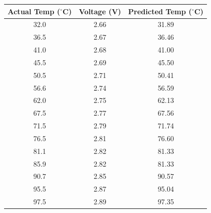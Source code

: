 \begin{tabular}{|c|c|c|}
    \hline
    \textbf{Actual Temp ($^{\circ}$C)} & \textbf{Voltage (V)} & \textbf{Predicted Temp ($^{\circ}$C)} \\
    \hline
    32.0 & 2.66 & 31.89 \\
    \hline
    36.5 & 2.67 & 36.46 \\
    \hline
    41.0 & 2.68 & 41.00 \\
    \hline
    45.5 & 2.69 & 45.50 \\
    \hline
    50.5 & 2.71 & 50.41 \\
    \hline
    56.6 & 2.74 & 56.59 \\
    \hline
    62.0 & 2.75 & 62.13 \\
    \hline
    67.5 & 2.77 & 67.56 \\
    \hline
    71.5 & 2.79 & 71.74 \\
    \hline
    76.5 & 2.81 & 76.60 \\
    \hline
    81.1 & 2.82 & 81.33 \\
    \hline
    85.9 & 2.82 & 81.33 \\
    \hline
    90.7 & 2.85 & 90.57 \\
    \hline
    95.5 & 2.87 & 95.04 \\
    \hline
    97.5 & 2.89 & 97.35 \\
    \hline
\end{tabular}
